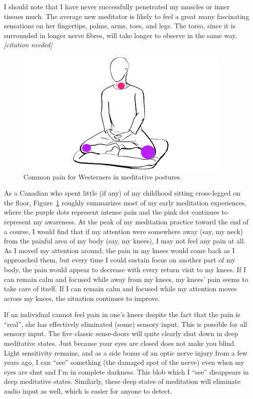 \documentclass{article}
\begin{document}
I should note that I have never successfully penetrated my muscles or inner tissues much. The average new meditator is likely to feel a great many fascinating sensations on her fingertips, palms, arms, toes, and legs. The torso, since it is surrounded in longer nerve fibres, will take longer to observe in the same way. \textit{[citation needed]}

\begin{figure}[h]
  \centering
  \includegraphics[width=\linewidth]{images/burmese-vipassana-pain.png}
  \caption{Common pain for Westerners in meditative postures.}
  \label{fig:burmese-vipassana-pain}
\end{figure}

As a Canadian who spent little (if any) of my childhood sitting cross-legged on the floor, Figure~\ref{fig:burmese-vipassana-pain} roughly summarizes most of my early meditation experiences, where the purple dots represent intense pain and the pink dot continues to represent my awareness. At the peak of my meditation practice toward the end of a course, I would find that if my attention were somewhere away (say, my neck) from the painful area of my body (say, my knees), I may not feel any pain at all. As I moved my attention around, the pain in my knees would come back as I approached them, but every time I could sustain focus on another part of my body, the pain would appear to decrease with every return visit to my knees. If I can remain calm and focused while away from my knees, my knees' pain seems to take care of itself. If I can remain calm and focused while my attention moves across my knees, the situation continues to improve.

If an individual cannot feel pain in one's knees despite the fact that the pain is ``real'', she has effectively eliminated (some) sensory input. This is possible for all sensory input. The five classic sense-doors will quite clearly shut down in deep meditative states. Just because your eyes are closed does not make you blind. Light sensitivity remains, and as a side bonus of an optic nerve injury from a few years ago, I can ``see'' something (the damaged spot of the nerve) even when my eyes are shut and I'm in complete darkness. This blob which I ``see'' disappears in deep meditative states. Similarly, these deep states of meditation will eliminate audio input as well, which is easier for anyone to detect.
\end{document}
